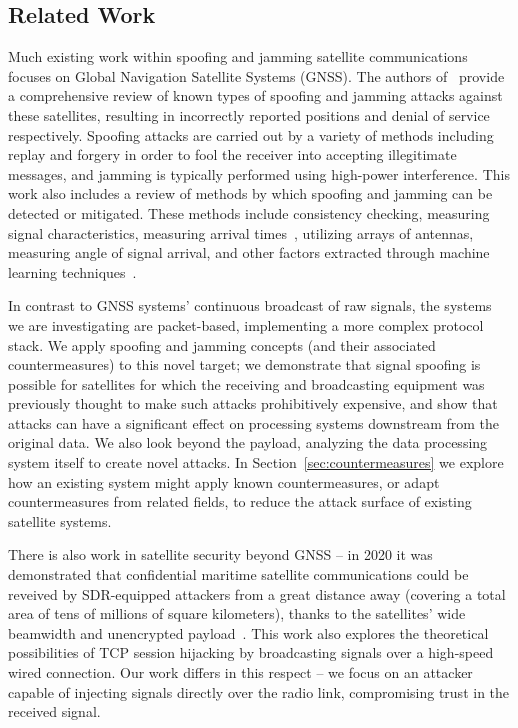 \subsection{Related Work}

Much existing work within spoofing and jamming satellite communications focuses on Global Navigation Satellite Systems (GNSS).
The authors of~\cite{wuSpoofing2020} provide a comprehensive review of known types of spoofing and jamming attacks against these satellites, resulting in incorrectly reported positions and denial of service respectively.
Spoofing attacks are carried out by a variety of methods including replay and forgery in order to fool the receiver into accepting illegitimate messages, and jamming is typically performed using high-power interference.
This work also includes a review of methods by which spoofing and jamming can be detected or mitigated.
These methods include consistency checking, measuring signal characteristics, measuring arrival times~\cite{jedermann2021orbit}, utilizing arrays of antennas, measuring angle of signal arrival, and other factors extracted through machine learning techniques~\cite{oligeri2020past}.

In contrast to GNSS systems' continuous broadcast of raw signals, the systems we are investigating are packet-based, implementing a more complex protocol stack.
We apply spoofing and jamming concepts (and their associated countermeasures) to this novel target; we demonstrate that signal spoofing is possible for satellites for which the receiving and broadcasting equipment was previously thought to make such attacks prohibitively expensive, and show that attacks can have a significant effect on processing systems downstream from the original data.
We also look beyond the payload, analyzing the data processing system itself to create novel attacks.
In Section~\ref{sec:countermeasures} we explore how an existing system might apply known countermeasures, or adapt countermeasures from related fields, to reduce the attack surface of existing satellite systems.

There is also work in satellite security beyond GNSS -- in 2020 it was demonstrated that confidential maritime satellite communications could be reveived by SDR-equipped attackers from a great distance away (covering a total area of tens of millions of square kilometers), thanks to the satellites' wide beamwidth and unencrypted payload~\cite{pavurTale2020}.
This work also explores the theoretical possibilities of TCP session hijacking by broadcasting signals over a high-speed wired connection.
Our work differs in this respect -- we focus on an attacker capable of injecting signals directly over the radio link, compromising trust in the received signal.

